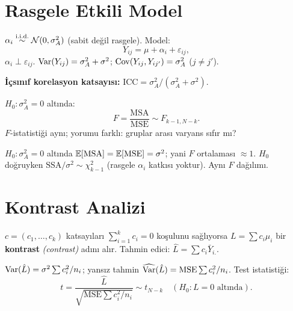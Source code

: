 \section{Rasgele Etkili Model}
\label{sec:rasgele_etkili}

\begin{tanim}\label{def:rasgele_etki}
$\alpha_i\overset{\text{i.i.d.}}{\sim}\mathcal{N}(0,\sigma_A^2)$ (sabit değil rasgele). Model:
\[
  Y_{ij} = \mu + \alpha_i + \varepsilon_{ij},
\]
$\alpha_i\perp\varepsilon_{ij}$. $\operatorname{Var}(Y_{ij})=\sigma_A^2+\sigma^2$; $\operatorname{Cov}(Y_{ij},Y_{ij'})=\sigma_A^2$ ($j\neq j'$).

\textbf{İçsınıf korelasyon katsayısı:} $\mathrm{ICC} = \sigma_A^2/(\sigma_A^2+\sigma^2)$.
\end{tanim}

\begin{teorem}\label{thm:rasgele_f}
$H_0:\sigma_A^2=0$ altında:
\[
  F = \frac{\mathrm{MSA}}{\mathrm{MSE}} \sim F_{k-1,N-k}.
\]
$F$-istatistiği aynı; yorumu farklı: gruplar arası varyans sıfır mı?
\end{teorem}

\begin{ispatiskele}
$H_0:\sigma_A^2=0$ altında $\mathbb{E}[\mathrm{MSA}]=\mathbb{E}[\mathrm{MSE}]=\sigma^2$; yani $F$ ortalaması $\approx 1$. $H_0$ doğruyken $\mathrm{SSA}/\sigma^2\sim\chi^2_{k-1}$ (rasgele $\alpha_i$ katkısı yoktur). Aynı $F$ dağılımı.
\end{ispatiskele}

\section{Kontrast Analizi}
\label{sec:kontrast}

\begin{tanim}[Kontrast]\label{def:kontrast}
$c=(c_1,\ldots,c_k)$ katsayıları $\sum_{i=1}^k c_i=0$ koşulunu sağlıyorsa $L=\sum c_i\mu_i$ bir \textbf{kontrast} \emph{(contrast)} adını alır. Tahmin edici: $\hat L=\sum c_i\bar Y_{i.}$.
\end{tanim}

\begin{teorem}\label{thm:kontrast_t}
$\operatorname{Var}(\hat L) = \sigma^2\sum c_i^2/n_i$; yansız tahmin $\widehat{\operatorname{Var}}(\hat L)=\mathrm{MSE}\sum c_i^2/n_i$. Test istatistiği:
\[
  t = \frac{\hat L}{\sqrt{\mathrm{MSE}\sum c_i^2/n_i}} \sim t_{N-k} \quad (H_0: L=0 \text{ altında}).
\]
\end{teorem}

